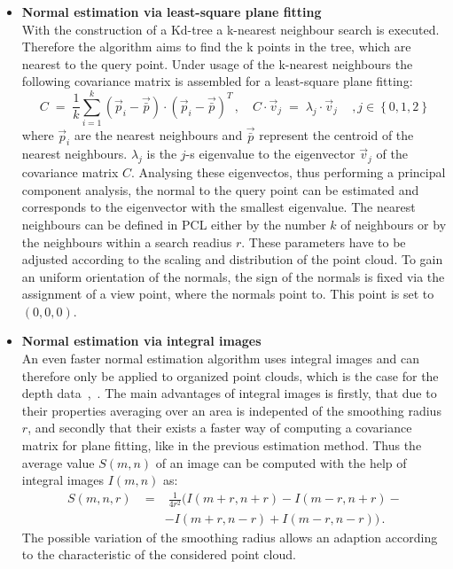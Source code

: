 \documentclass[paper=a4,11pt,bibliography=totoc]{scrartcl}
\begin{document}
\begin{itemize}
%
\item \textbf{Normal estimation via least-square plane fitting}\\
With the construction of a Kd-tree a k-nearest neighbour search is executed. Therefore the algorithm aims to find the k points in the tree, which are nearest to the query point. Under usage of the k-nearest neighbours the following covariance matrix is assembled for a least-square plane fitting:
%
\begin{equation}
C\;=\;\frac1k\sum_{i=1}^k(\vec{p}_i-\vec{\bar p})\cdot(\vec{p}_i-\vec{\bar p})^T\,,\quad C\cdot \vec{v}_j\;=\;\lambda_j\cdot \vec{v}_j\,\quad, j \in \left\lbrace 0, 1, 2 \right\rbrace
\end{equation}
%
where $\vec{p}_i$ are the nearest neighbours and $\vec{\bar p}$ represent the centroid of the nearest neighbours. $\lambda_j$ is the $j$-s eigenvalue to the eigenvector $\vec{v}_j$ of the covariance matrix $C$. Analysing these eigenvectos, thus performing a principal component analysis, the normal to the query point can be estimated and corresponds to the eigenvector with the smallest eigenvalue. The nearest neighbours can be defined in PCL either by the number $k$ of neighbours or by the neighbours within a search readius $r$. These parameters have to be adjusted according to the scaling and distribution of the point cloud. To gain an uniform orientation of the normals, the sign of the normals is fixed via the assignment of a view point, where the normals point to. This point is set to $(0,0,0)$.
%
\item \textbf{Normal estimation via integral images}\\
An even faster normal estimation algorithm uses integral images and can therefore only be applied to organized point clouds, which is the case for the depth data~\cite{pcldoc},~\cite{integral}. The main advantages of integral images is firstly, that due to their properties averaging over an area is indepented of the smoothing radius $r$, and secondly that their exists a faster way of computing a covariance matrix for plane fitting, like in the previous estimation method. Thus the average value $S\left(m,n\right)$ of an image can be computed with the help of integral images $I\left(m,n\right)$ as:
%
\begin{eqnarray}
S\left(m,n,r\right)\;&=&\;\frac1{4r^2}(I\left(m+r,n+r\right)-I\left(m-r,n+r\right)-\nonumber\\
& &-I\left(m+r,n-r\right)+I\left(m-r,n-r\right))\,.
\end{eqnarray}
%
The possible variation of the smoothing radius allows an adaption according to the characteristic of the considered point cloud.


\end{itemize}
\end{document}
